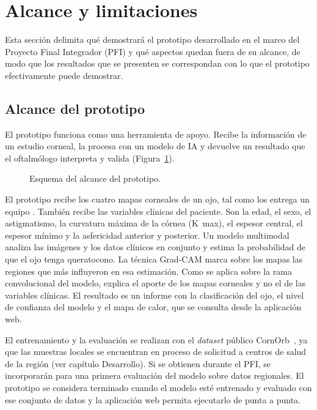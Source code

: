 \section{Alcance y limitaciones}

    Esta sección delimita qué demostrará el prototipo desarrollado en el marco del Proyecto Final Integrador (PFI) y qué aspectos quedan fuera de su alcance, de modo que los resultados que se presenten se correspondan con lo que el prototipo efectivamente puede demostrar.

    \subsection*{Alcance del prototipo}

        El prototipo funciona como una herramienta de apoyo. Recibe la información de un estudio corneal, la procesa con un modelo de IA y devuelve un resultado que el oftalmólogo interpreta y valida (Figura~\ref{fig:alcance_prototipo}).

        \begin{figure}[H] \centering
            
            \caption{Esquema del alcance del prototipo.}
            \label{fig:alcance_prototipo}
        \end{figure}

        El prototipo recibe los cuatro mapas corneales de un ojo, tal como los entrega un equipo \Orbscan{}. También recibe las variables clínicas del paciente. Son la edad, el sexo, el astigmatismo, la curvatura máxima de la córnea (K~max), el espesor central, el espesor mínimo y la asfericidad anterior y posterior. Un modelo multimodal analiza las imágenes y los datos clínicos en conjunto y estima la probabilidad de que el ojo tenga queratocono. La técnica Grad-CAM marca sobre los mapas las regiones que más influyeron en esa estimación. Como se aplica sobre la rama convolucional del modelo, explica el aporte de los mapas corneales y no el de las variables clínicas. El resultado es un informe con la clasificación del ojo, el nivel de confianza del modelo y el mapa de calor, que se consulta desde la aplicación web.

        El entrenamiento y la evaluación se realizan con el \textit{dataset} público CornOrb~\cite{zenodo}, ya que las muestras locales se encuentran en proceso de solicitud a centros de salud de la región (ver capítulo Desarrollo). Si se obtienen durante el PFI, se incorporarán para una primera evaluación del modelo sobre datos regionales. El prototipo se considera terminado cuando el modelo esté entrenado y evaluado con ese conjunto de datos y la aplicación web permita ejecutarlo de punta a punta.

